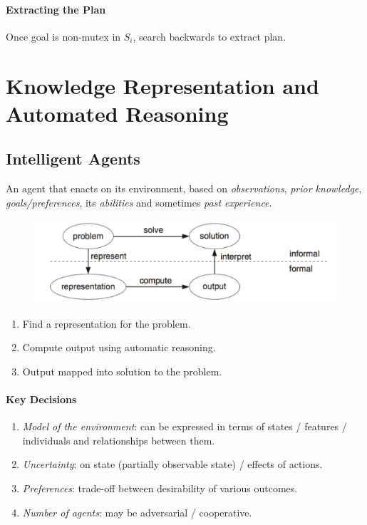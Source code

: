 \documentclass[twocolumn,english]{article}
\begin{document}
\paragraph{Extracting the Plan}

Once goal is non-mutex in $S_{i}$, search backwards to extract plan.

\section{Knowledge Representation and Automated Reasoning}

\subsection{Intelligent Agents}

An agent that enacts on its environment, based on \emph{observations},
\emph{prior knowledge}, \emph{goals/preferences}, its \emph{abilities}
and sometimes \emph{past experience}.

\begin{figure}[H]
\centering{}\includegraphics[width=0.6\columnwidth]{img/representation}
\end{figure}
\begin{enumerate}
\item Find a representation for the problem.
\item Compute output using automatic reasoning.
\item Output mapped into solution to the problem.
\end{enumerate}

\paragraph{Key Decisions}
\begin{enumerate}
\item \emph{Model of the environment}: can be expressed in terms of states
/ features / individuals and relationships between them.
\item \emph{Uncertainty}: on state (partially observable state) / effects
of actions.
\item \emph{Preferences}: trade-off between desirability of various outcomes.
\item \emph{Number of agents}: may be adversarial / cooperative.
\end{enumerate}
\end{document}

